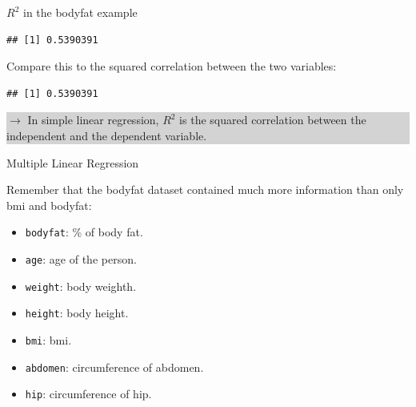 \documentclass[10pt,ignorenonframetext,]{beamer}
\newenvironment{Shaded}{\begin{snugshade}}{\end{snugshade}}
\newcommand{\KeywordTok}[1]{\textcolor[rgb]{0.13,0.29,0.53}{\textbf{#1}}}
\newcommand{\DecValTok}[1]{\textcolor[rgb]{0.00,0.00,0.81}{#1}}
\newcommand{\OperatorTok}[1]{\textcolor[rgb]{0.81,0.36,0.00}{\textbf{#1}}}
\newcommand{\NormalTok}[1]{#1}
\providecommand{\tightlist}{%
  \setlength{\itemsep}{0pt}\setlength{\parskip}{0pt}}
\begin{document}
\begin{frame}[fragile]

\begin{block}{\(R^2\) in the bodyfat example}

\begin{Shaded}
\end{Shaded}

\begin{verbatim}
## [1] 0.5390391
\end{verbatim}

Compare this to the squared correlation between the two variables:

\begin{Shaded}
\end{Shaded}

\begin{verbatim}
## [1] 0.5390391
\end{verbatim}

\colorbox{lightgray}{\begin{minipage}{10cm}
$\rightarrow$ In simple linear regression, $R^2$ is the squared correlation between the independent and the dependent variable.
\end{minipage}}

\end{block}

\end{frame}

\begin{frame}[fragile]{Multiple Linear Regression}

Remember that the bodyfat dataset contained much more information than
only bmi and bodyfat:

\begin{itemize}
\tightlist
\item
  \texttt{bodyfat}: \% of body fat.
\item
  \texttt{age}: age of the person.
\item
  \texttt{weight}: body weighth.
\item
  \texttt{height}: body height.
\item
  \texttt{bmi}: bmi.
\item
  \texttt{abdomen}: circumference of abdomen.
\item
  \texttt{hip}: circumference of hip.
\end{itemize}

\end{frame}
\end{document}
